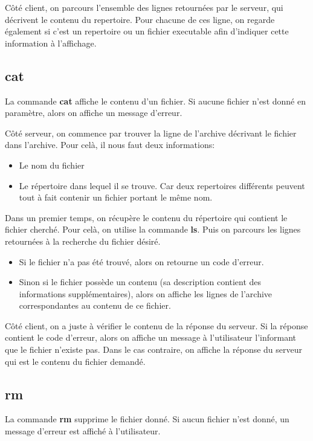 \documentclass[titlepage]{article}
\begin{document}
	Côté client, on parcours l'ensemble des lignes retournées par le serveur, qui décrivent le contenu du repertoire. Pour chacune de ces ligne, on regarde également si c'est un repertoire ou un fichier executable afin d'indiquer cette information à l'affichage.

	\subsection{cat}

	La commande \textbf{cat} affiche le contenu d'un fichier. Si aucune fichier n'est donné en paramètre, alors on affiche un message d'erreur.

	Côté serveur, on commence par trouver la ligne de l'archive décrivant le fichier dans l'archive. Pour celà, il nous faut deux informations:
	\begin{itemize}  
		\item Le nom du fichier   
		\item Le répertoire dans lequel il se trouve. Car deux repertoires différents peuvent tout à fait contenir un fichier portant le même nom.   
	\end{itemize}

	Dans un premier temps, on récupère le contenu du répertoire qui contient le fichier cherché. Pour celà, on utilise la commande \textbf{ls}. Puis on parcours les lignes retournées à la recherche du fichier désiré.

	\begin{itemize}
		\item Si le fichier n'a pas été trouvé, alors on retourne un code d'erreur.
		\item Sinon si le fichier possède un contenu (sa description contient des informations supplémentaires), alors on affiche les lignes de l'archive correspondantes au contenu de ce fichier.
	\end{itemize}

	Côté client, on a juste à vérifier le contenu de la réponse du serveur. Si la réponse contient le code d'erreur, alors on affiche un message à l'utilisateur l'informant que le fichier n'existe pas. Dans le cas contraire, on affiche la réponse du serveur qui est le contenu du fichier demandé.

	\subsection{rm}

	La commande \textbf{rm} supprime le fichier donné. Si aucun fichier n'est donné, un message d'erreur est affiché à l'utilisateur.
\end{document}

